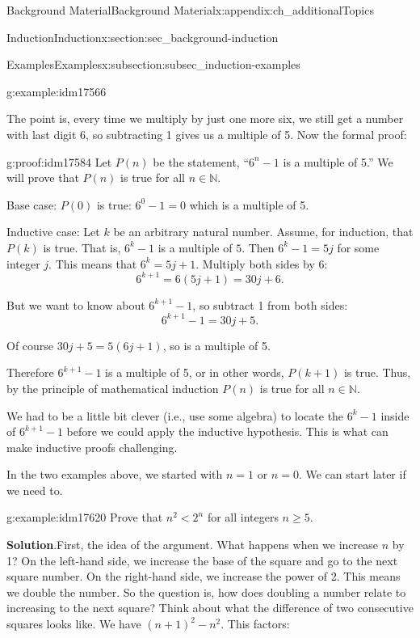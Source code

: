 \documentclass[oneside,10pt,]{book}
\numberwithin{equation}{chapter}
\def\N{\mathbb N}
\newcommand{\lt}{<}
\begin{document}
\begin{appendixptx}{Background Material}{}{Background Material}{}{}{x:appendix:ch_additionalTopics}
\begin{sectionptx}{Induction}{}{Induction}{}{}{x:section:sec_background-induction}
\begin{subsectionptx}{Examples}{}{Examples}{}{}{x:subsection:subsec_induction-examples}
\begin{example}{}{g:example:idm17566}
\par
The point is, every time we multiply by just one more six, we still get a number with last digit 6, so subtracting 1 gives us a multiple of 5. Now the formal proof:%
\begin{proofptx}{}{g:proof:idm17584}
Let \(P(n)\) be the statement, ``\(6^n - 1\) is a multiple of 5.'' We will prove that \(P(n)\) is true for all \(n \in \N\).%
\par
Base case: \(P(0)\) is true: \(6^0 -1 = 0\) which is a multiple of 5.%
\par
Inductive case: Let \(k\) be an arbitrary natural number. Assume, for induction, that \(P(k)\) is true. That is, \(6^k - 1\) is a multiple of \(5\). Then \(6^k - 1 = 5j\) for some integer \(j\). This means that \(6^k = 5j + 1\). Multiply both sides by \(6\):%
\begin{equation*}
6^{k+1} = 6(5j+1) = 30j + 6.
\end{equation*}
%
\par
But we want to know about \(6^{k+1} - 1\), so subtract 1 from both sides:%
\begin{equation*}
6^{k+1} - 1 = 30j + 5.
\end{equation*}
%
\par
Of course \(30j+5 = 5(6j+1)\), so is a multiple of 5.%
\par
Therefore \(6^{k+1} - 1\) is a multiple of 5, or in other words, \(P(k+1)\) is true. Thus, by the principle of mathematical induction \(P(n)\) is true for all \(n \in \N\).%
\end{proofptx}
\end{example}
We had to be a little bit clever (i.e., use some algebra) to locate the \(6^k - 1\) inside of \(6^{k+1} - 1\) before we could apply the inductive hypothesis. This is what can make inductive proofs challenging.%
\par
In the two examples above, we started with \(n = 1\) or \(n = 0\). We can start later if we need to.%
\begin{example}{}{g:example:idm17620}%
Prove that \(n^2 \lt  2^n\) for all integers \(n \ge 5\).%
\par\smallskip%
\noindent\textbf{Solution}.\hypertarget{g:solution:idm17625}{}\quad{}First, the idea of the argument. What happens when we increase \(n\) by 1? On the left-hand side, we increase the base of the square and go to the next square number. On the right-hand side, we increase the power of 2. This means we double the number. So the question is, how does doubling a number relate to increasing to the next square? Think about what the difference of two consecutive squares looks like. We have \((n+1)^2 - n^2\). This factors:%

\end{example}
\end{subsectionptx}
\end{sectionptx}
\end{appendixptx}
\end{document}
